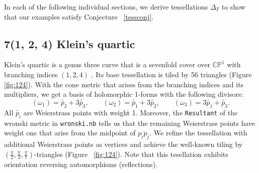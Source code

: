 \documentclass[12pt,reqno]{amsart}
\theoremstyle{definition}
\theoremstyle{remark}
\newtheorem*{remark}{Remark}
\begin{document}


In each of the following individual sections, we derive tessellations $\Delta_T$ to show that our examples satisfy Conjecture ~\ref{tessconj}.



\subsection*{7(1, 2, 4) Klein's quartic } 



Klein's quartic is a genus three curve that is a sevenfold cover over $\mathbb{C}\mathbb{P}^1$ with branching indices $(1,2,4)$ \cite{kw}. Its base tessellation is tiled by 56 triangles (Figure~ \cref{fig:124}). With the cone metric that arises from the branching indices and its multipliers, we get a basis of holomorphic 1-forms with the following divisors: $$(\omega_1) = \widetilde{p_2} + 3 \widetilde{p_3}, \qquad (\omega_2) = \widetilde{p_1} + 3 \widetilde{p_2}, \qquad (\omega_3) = 3 \widetilde{p_1} + \widetilde{p_3}.$$ All $\widetilde{p_i}$ are Weierstrass points with weight 1. Moreover, the \texttt{Resultant} of the wronski metric in \texttt{wronski.nb} tells us that the remaining Weierstrass points have weight one that arise from the midpoint of $\overline{p_i p_j}.$ We refine the tessellation with additional Weierstrass points as vertices and achieve the well-known tiling by $(\frac{\pi}{2}, \frac{\pi}{3}, \frac{\pi}{7})$-triangles (Figure~ \cref{fig:124}). Note that this tesellation exhibits orientation reversing automorphisms (reflections). 
\end{document}
